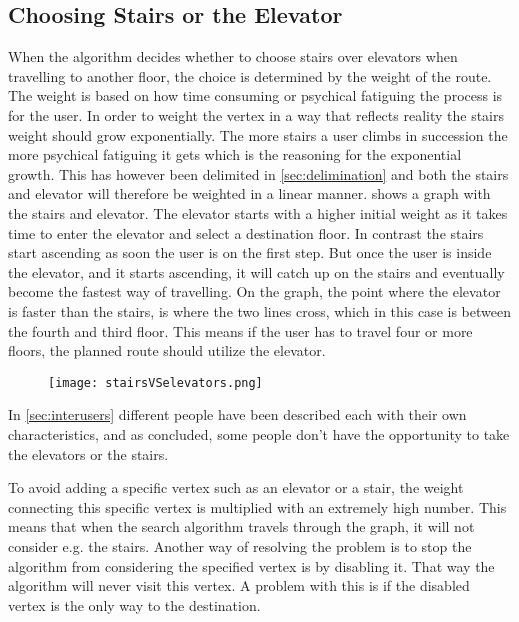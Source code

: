 \subsection{Choosing Stairs or the Elevator}

When the algorithm decides whether to choose stairs over elevators when travelling to another floor, the choice is determined by the weight of the route. The weight is based on how time consuming or psychical fatiguing the process is for the user. In order to weight the vertex in a way that reflects reality the stairs weight should grow exponentially. The more stairs a user climbs in succession the more psychical fatiguing it gets which is the reasoning for the exponential growth. This has however been delimited in \cref{sec:delimination} and both the stairs and elevator will therefore be weighted in a linear manner.  shows a graph with the stairs and elevator. The elevator starts with a higher initial weight as it takes time to enter the elevator and select a destination floor. In contrast the stairs start ascending as soon the user is on the first step. But once the user is inside the elevator, and it starts ascending, it will catch up on the stairs and eventually become the fastest way of travelling. On the graph, the point where the elevator is faster than the stairs, is where the two lines cross, which in this case is between the fourth and third floor. This means if the user has to travel four or more floors, the planned route should utilize the elevator.

\begin{figure}[ht!]
    \centering
    \texttt{[image: stairsVSelevators.png]}
    \caption{}\label{fig:labeled_stairsVSelevators}
  \end{figure}


In \cref{sec:interusers} different people have been described each with their own characteristics, and as concluded, some people don't have the opportunity to take the elevators or the stairs. 

To avoid adding a specific vertex such as an elevator or a stair, the weight connecting this specific vertex is multiplied with an extremely high number. This means that when the search algorithm travels through the graph, it will not consider e.g. the stairs.
Another way of resolving the problem is to stop the algorithm from considering the specified vertex is by disabling it. That way the algorithm will never visit this vertex. A problem with this is if the disabled vertex is the only way to the destination.



